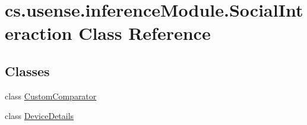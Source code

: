 \hypertarget{classcs_1_1usense_1_1inference_module_1_1_social_interaction}{}\section{cs.\+usense.\+inference\+Module.\+Social\+Interaction Class Reference}
\label{classcs_1_1usense_1_1inference_module_1_1_social_interaction}
\subsection*{Classes}
\begin{DoxyCompactItemize}
\item 
class \hyperlink{classcs_1_1usense_1_1inference_module_1_1_social_interaction_1_1_custom_comparator}{Custom\+Comparator}
\item 
class \hyperlink{classcs_1_1usense_1_1inference_module_1_1_social_interaction_1_1_device_details}{Device\+Details}
\end{DoxyCompactItemize}
